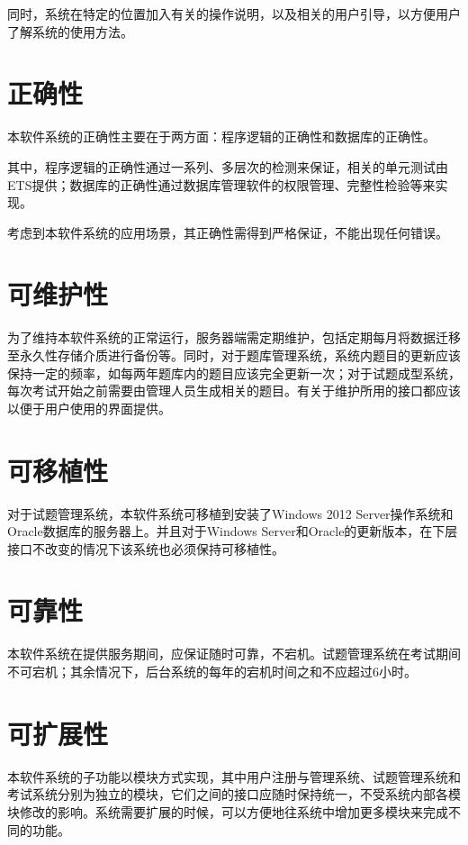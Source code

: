同时，系统在特定的位置加入有关的操作说明，以及相关的用户引导，以方便用户了解系统的使用方法。

\section{正确性}
本软件系统的正确性主要在于两方面：程序逻辑的正确性和数据库的正确性。

其中，程序逻辑的正确性通过一系列、多层次的检测来保证，相关的单元测试由ETS提供；数据库的正确性通过数据库管理软件的权限管理、完整性检验等来实现。

考虑到本软件系统的应用场景，其正确性需得到严格保证，不能出现任何错误。

\section{可维护性}
为了维持本软件系统的正常运行，服务器端需定期维护，包括定期每月将数据迁移至永久性存储介质进行备份等。同时，对于题库管理系统，系统内题目的更新应该保持一定的频率，如每两年题库内的题目应该完全更新一次；对于试题成型系统，每次考试开始之前需要由管理人员生成相关的题目。有关于维护所用的接口都应该以便于用户使用的界面提供。

\section{可移植性}
对于试题管理系统，本软件系统可移植到安装了Windows 2012 Server操作系统和Oracle数据库的服务器上。并且对于Windows Server和Oracle的更新版本，在下层接口不改变的情况下该系统也必须保持可移植性。

\section{可靠性}
本软件系统在提供服务期间，应保证随时可靠，不宕机。试题管理系统在考试期间不可宕机；其余情况下，后台系统的每年的宕机时间之和不应超过6小时。

\section{可扩展性}
本软件系统的子功能以模块方式实现，其中用户注册与管理系统、试题管理系统和考试系统分别为独立的模块，它们之间的接口应随时保持统一，不受系统内部各模块修改的影响。系统需要扩展的时候，可以方便地往系统中增加更多模块来完成不同的功能。